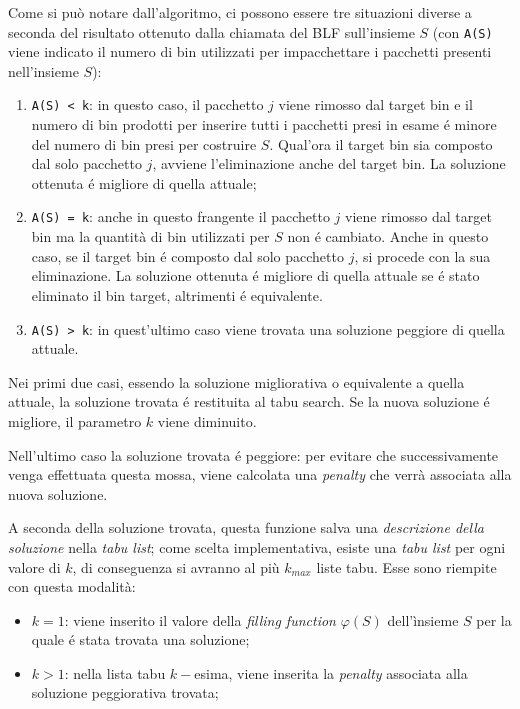 Come si può notare dall'algoritmo, ci possono essere tre situazioni diverse a seconda del risultato ottenuto dalla chiamata del BLF sull'insieme $S$ (con \texttt{A(S)} viene indicato il numero di bin utilizzati per impacchettare i pacchetti presenti nell'insieme $S$):
\begin{enumerate}[noitemsep]
   \item \texttt{A(S) < k}: in questo caso, il pacchetto $j$ viene rimosso dal target bin e il numero di bin prodotti per inserire tutti i pacchetti presi in esame é minore del numero di bin presi per costruire $S$. Qual'ora il target bin sia composto dal solo pacchetto $j$, avviene l'eliminazione anche del target bin. La soluzione ottenuta é migliore di quella attuale;
   \item \texttt{A(S) = k}: anche in questo frangente il pacchetto $j$ viene rimosso dal target bin ma la quantità di bin utilizzati per $S$ non é cambiato. Anche in questo caso, se il target bin é composto dal solo pacchetto $j$, si procede con la sua eliminazione. La soluzione ottenuta é migliore di quella attuale se é stato eliminato il bin target, altrimenti é equivalente.
   \item \texttt{A(S) > k}: in quest'ultimo caso viene trovata una soluzione peggiore di quella attuale.
\end{enumerate}

Nei primi due casi, essendo la soluzione migliorativa o equivalente a quella attuale, la soluzione trovata é restituita al tabu search. Se la nuova soluzione é migliore, il parametro $k$ viene diminuito.

Nell'ultimo caso la soluzione trovata é peggiore: per evitare che successivamente venga effettuata questa mossa, viene calcolata una \textit{penalty} che verrà associata alla nuova soluzione.

A seconda della soluzione trovata, questa funzione salva una \textit{descrizione della soluzione} nella \textit{tabu list}; come scelta implementativa, esiste una \textit{tabu list} per ogni valore di $k$, di conseguenza si avranno al più $k_{max}$ liste tabu. Esse sono riempite con questa modalità:
\begin{itemize}[noitemsep]
   \item \textit{$k=1$}: viene inserito il valore della \textit{filling function} $\varphi(S)$ dell'ìnsieme $S$ per la quale é stata trovata una soluzione;
   \item \textit{$k>1$}: nella lista tabu $k-$esima, viene inserita la \textit{penalty} associata alla soluzione peggiorativa trovata;
\end{itemize}


